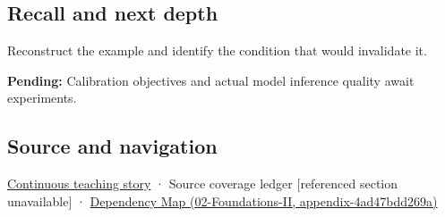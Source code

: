 \subsection{Recall and next depth}\label{appendix-d5da3eaabaef-recall-and-next-depth}

Reconstruct the example and identify the condition that would invalidate it.

\textbf{Pending:} Calibration objectives and actual model inference quality await experiments.

\subsection{Source and navigation}\label{appendix-d5da3eaabaef-source-and-navigation}

\hyperref[01-foundations-i-ch001-choosing-what-information-to-keep]{Continuous teaching story} · {Source coverage ledger {[}referenced section unavailable{]}} · \href{../02-Foundations-II/main.pdf\#nameddest=appendix-4ad47bdd269a}{Dependency Map (02-Foundations-II, appendix-4ad47bdd269a)}

